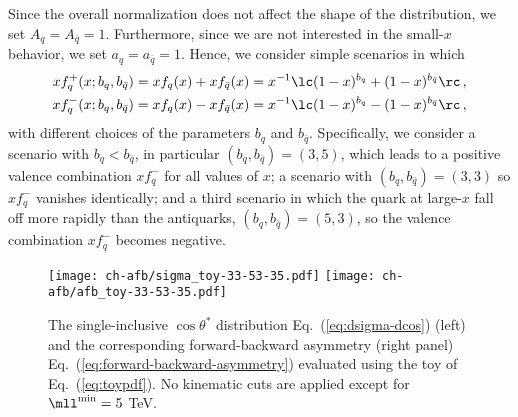 Since the overall normalization does not affect the shape
of the distribution, we set $A_q=A_{\bar{q}}=1$.
%
Furthermore, since we are not interested in the small-$x$ behavior,
we set $a_q=a_{\bar{q}}=1$. 
%
Hence, we consider simple scenarios in which 
\begin{align}\label{eq:toyp}
xf_q^+(x; b_q,b_{\bar{q}}) &= xf_q(x)+xf_{\bar{q}}(x) = x^{-1}\lc (1-x)^{b_q} +(1-x)^{b_{\bar{q}}}  \rc  \,, \\\label{eq:toym}
xf_q^-(x; b_q,b_{\bar{q}}) &= xf_q(x)-xf_{\bar{q}}(x) = x^{-1}\lc (1-x)^{b_q} -(1-x)^{b_{\bar{q}}}  \rc  \,, 
\end{align}
with different choices of the parameters  $b_q$ and $b_{\bar{q}}$.
Specifically, we consider a scenario with $b_q < b_{\bar{q}} $, in particular
$(b_q,b_{\bar{q}})=(3,5)$, which leads to a positive valence combination $xf_q^-$
for all values of $x$;  a  scenario with
$(b_q,b_{\bar{q}})=(3,3)$ so  $xf_q^-$ vanishes identically; and a third scenario
in which the quark \pdfs at large-$x$ fall off more rapidly than the antiquarks,
$(b_q,b_{\bar{q}})=(5,3)$, so the valence combination $xf_q^-$ becomes negative.

\begin{figure}[!t]
 \centering
 \texttt{[image: ch-afb/sigma\_toy-33-53-35.pdf]}
 \texttt{[image: ch-afb/afb\_toy-33-53-35.pdf]}
 \caption{The single-inclusive $\cos\theta^*$ distribution
   Eq.~(\ref{eq:dsigma-dcos})  (left)
   and the corresponding forward-backward asymmetry
   (right panel) Eq.~(\ref{eq:forward-backward-asymmetry}) evaluated using 
    the toy \pdfs of Eq.~(\ref{eq:toypdf}).
   No  kinematic cuts are applied except for $\mll^{\rm min}=5$ TeV.
 }    
 \label{fig:sigma_toy}
\end{figure}

